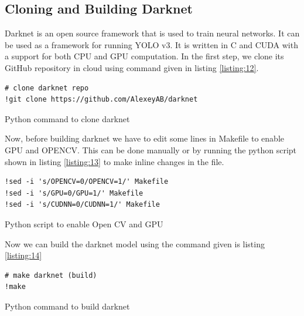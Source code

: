 \subsection{Cloning and Building Darknet}
Darknet is an open source framework that is used to train neural networks. It can be used as a framework for running YOLO v3. It is written in C and CUDA with a support for both CPU and GPU computation. In the first step, we clone its GitHub repository in cloud using command given in listing \ref{listing:12}.
\begin{longlisting}
\begin{verbatim}
# clone darknet repo
!git clone https://github.com/AlexeyAB/darknet
\end{verbatim}
\caption{Python command to clone darknet}
\label{listing:12}
\end{longlisting}
Now, before building darknet we have to edit some lines in Makefile to enable GPU and OPENCV. This can be done manually or by running the python script shown in listing \ref{listing:13} to make inline changes in the file.
\begin{longlisting}
\begin{verbatim}
!sed -i 's/OPENCV=0/OPENCV=1/' Makefile
!sed -i 's/GPU=0/GPU=1/' Makefile
!sed -i 's/CUDNN=0/CUDNN=1/' Makefile
\end{verbatim}
\caption{Python script to enable Open CV and GPU}
\label{listing:13}
\end{longlisting}
Now we can build the darknet model using the command given is listing \ref{listing:14}
\begin{longlisting}
\begin{verbatim}
# make darknet (build)
!make
\end{verbatim}
\caption{Python command to build darknet}
\label{listing:14}
\end{longlisting}

